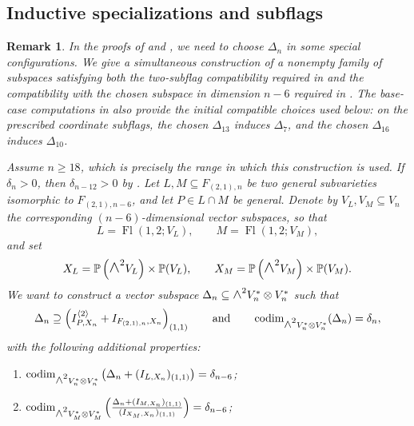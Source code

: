 \documentclass[a4paper,reqno]{amsart}
\theoremstyle{plainnopunct}
\theoremstyle{definitionnopunct}
\newtheorem{remark}[remark]{Remark}
\newcommand{\superwedge}{\mathlarger{\mathlarger{\wedge}}}
\renewcommand{\P}{\mathbb{P}}
\newcommand{\codim}{\operatorname{codim}}
\DeclareMathOperator{\Fl}{Fl}
\begin{document}
\subsection{Inductive specializations and subflags}
\label{subsect: recursive specializations}

\begin{remark}
\label{rem:construction}
In the proofs of  and , we need to choose
$\Delta_n$ in some special configurations.
We give a simultaneous construction of a nonempty family of
subspaces satisfying both the two-subflag compatibility required in
 and the compatibility with the chosen subspace in
dimension $n-6$ required in . The base-case computations in \cite{Repo} also provide the initial compatible choices used below: on the prescribed coordinate subflags, the chosen $\Delta_{13}$ induces $\Delta_7$, and the chosen $\Delta_{16}$ induces $\Delta_{10}$.

Assume $n\geq18$, which is precisely the range in which this
construction is used. If $\delta_n>0$, then
$\delta_{n-12}>0$ by . Let $L,M \subseteq F_{(2,1),n}$ be two general subvarieties isomorphic to $F_{(2,1),n-6}$, and let $P\in L\cap M$ be general. Denote by $V_L,V_M\subseteq V_n$ the corresponding $(n-6)$-dimensional vector subspaces, so that
\[
L=\Fl(1,2;V_L),
\qquad
M=\Fl(1,2;V_M),
\]
and set
\[
X_L
=
\P\left(\superwedge^2V_L\right)\times\P(V_L),
\qquad
X_M
=
\P\left(\superwedge^2V_M\right)\times\P(V_M).
\]
We want to construct a vector subspace $\Delta_n \subseteq \superwedge^2V_n^*\otimes V_n^* $ such that
\[
\Delta_n
\supseteq
\left(
I_{P,X_n}^{\langle2\rangle}
+
I_{F_{(2,1),n},X_n}
\right)_{(1,1)}
\qquad
\text{and}
\qquad
\codim_{\superwedge^2V_n^*\otimes V_n^*}(\Delta_n)
=
\delta_n,
\]
with the following additional properties:
\begin{enumerate}[leftmargin=*]
    \item
    $
    \codim_{\superwedge^2V_n^*\otimes V_n^*}
    \left(
    \Delta_n+(I_{L,X_n})_{(1,1)}
    \right)
    =
    \delta_{n-6}$;

    \item
    $
    \codim_{\superwedge^2V_M^*\otimes V_M^*}
    \left(
    \frac{
    \Delta_n+(I_{M,X_n})_{(1,1)}
    }{
    (I_{X_M,X_n})_{(1,1)}
    }
    \right)
    =
    \delta_{n-6}$;



\end{enumerate}
\end{remark}
\end{document}
